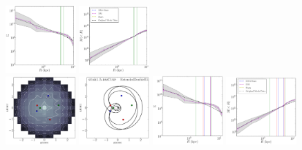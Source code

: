 \documentclass[galley,usenatbib]{mn2e}
\begin{document}
\begin{figure}
\includegraphics[width=0.24\textwidth]{BCQuadR1a-nosymm_Tms-appendix-c-1.pdf}
\includegraphics[width=0.24\textwidth]{BCQuadR1a-nosymm_Tms-appendix-d-1.pdf}\\
%
\includegraphics[width=0.24\textwidth]{BCExtendedDoubleR1-nosymm_tms-appendix-a.pdf}
\includegraphics[width=0.24\textwidth]{BCExtendedDoubleR1-nosymm_tms-appendix-b.pdf}
\includegraphics[width=0.24\textwidth]{BCExtendedDoubleR1-nosymm_tms-appendix-c.pdf}
\includegraphics[width=0.24\textwidth]{BCExtendedDoubleR1-nosymm_tms-appendix-d.pdf}

\end{figure}
\end{document}
